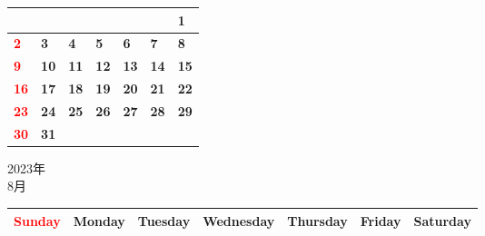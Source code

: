 \documentclass[a4paper,landscape]{jsarticle}
\newcommand{\dig}{\hspace{29mm}}
\newcommand{\tdig}{\hspace{27mm}}
\newcommand{\LBF}{\LARGE\textbf}
\begin{document}
\begingroup
\renewcommand{\arraystretch}{4}
\begin{tabular}{|p{32mm}|p{32mm}|p{32mm}|p{32mm}|p{32mm}|p{32mm}|p{32mm}|}
\hline
&&&&&&\raisebox{30pt} {\dig\LBF{1}}\\
\hline
\raisebox{30pt} {\dig\textcolor{red}{\LBF{2}}}&\raisebox{30pt} {\dig\LBF{3}}&\raisebox{30pt} {\dig\LBF{4}}&\raisebox{30pt} {\dig\LBF{5}}&\raisebox{30pt} {\dig\LBF{6}}&\raisebox{30pt} {\dig\LBF{7}}&\raisebox{30pt} {\dig\LBF{8}}\\
\hline
\raisebox{30pt} {\dig\textcolor{red}{\LBF{9}}}&\raisebox{30pt} {\tdig\LBF{10}}&\raisebox{30pt} {\tdig\LBF{11}}&\raisebox{30pt} {\tdig\LBF{12}}&\raisebox{30pt} {\tdig\LBF{13}}&\raisebox{30pt} {\tdig\LBF{14}}&\raisebox{30pt} {\tdig\LBF{15}}\\
\hline
\raisebox{30pt} {\tdig\textcolor{red}{\LBF{16}}}&\raisebox{30pt} {\tdig\LBF{17}}&\raisebox{30pt} {\tdig\LBF{18}}&\raisebox{30pt} {\tdig\LBF{19}}&\raisebox{30pt} {\tdig\LBF{20}}&\raisebox{30pt} {\tdig\LBF{21}}&\raisebox{30pt} {\tdig\LBF{22}}\\
\hline
\raisebox{30pt} {\tdig\textcolor{red}{\LBF{23}}}&\raisebox{30pt} {\tdig\LBF{24}}&\raisebox{30pt} {\tdig\LBF{25}}&\raisebox{30pt} {\tdig\LBF{26}}&\raisebox{30pt} {\tdig\LBF{27}}&\raisebox{30pt} {\tdig\LBF{28}}&\raisebox{30pt} {\tdig\LBF{29}}\\
\hline
\raisebox{30pt} {\tdig\textcolor{red}{\LBF{30}}}&\raisebox{30pt} {\tdig\LBF{31}}&&&&&\\
\hline
\end{tabular}
\endgroup

\newpage

\begin{center}
	\LARGE 2023年\\
	\LARGE 8月
\end{center}

\begingroup
\renewcommand{\arraystretch}{1.4}
\begin{tabular}{|>{\centering\arraybackslash}p{32mm}|>{\centering\arraybackslash}p{32mm}|>{\centering\arraybackslash}p{32mm}|>{\centering\arraybackslash}p{32mm}|>{\centering\arraybackslash}p{32mm}|>{\centering\arraybackslash}p{32mm}|>{\centering\arraybackslash}p{32mm}|}
\hline
\textcolor{red}{\large Sunday}&\large Monday&\large Tuesday&\large Wednesday&\large Thursday&\large Friday&\large Saturday\\
\hline
\end{tabular}
\endgroup
\end{document}
